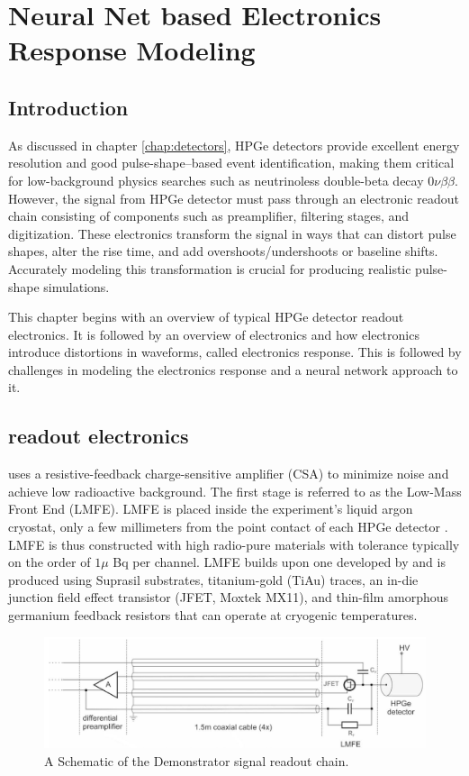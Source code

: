 \chapter{Neural Net based Electronics Response Modeling}
\label{chap:elect_resp}

\section{Introduction}
As discussed in chapter \ref{chap:detectors}, HPGe detectors provide excellent energy resolution and good pulse-shape–based event identification, making them critical for low-background physics searches such as neutrinoless double-beta decay $0\nu\beta\beta$. However, the signal from HPGe detector must pass through an electronic readout chain consisting of components such as preamplifier, filtering stages, and digitization. These electronics transform the signal in ways that can distort pulse shapes, alter the rise time, and add overshoots/undershoots or baseline shifts. Accurately modeling this transformation is crucial for producing realistic pulse-shape simulations.

This chapter begins with an overview of typical HPGe detector readout electronics. It is followed by an overview of {\Ltwo}  electronics and how electronics introduce distortions in waveforms, called electronics response. This is followed by challenges in modeling the electronics response and a neural network approach to it.

\section{{\Ltwo} readout electronics}

{\Ltwo} uses a resistive-feedback charge-sensitive amplifier (CSA) to minimize noise and achieve low radioactive background. The first stage is referred to as the Low-Mass Front End (LMFE). LMFE is placed inside the experiment’s liquid argon cryostat, only a few millimeters from the point contact of each HPGe detector \cite{Willers_2020}. LMFE is thus constructed with high radio-pure materials with tolerance typically on the order of $1\mu$ Bq per channel. LMFE builds upon one developed by {\MJD} and is produced using Suprasil substrates, titanium-gold (TiAu) traces, an in-die junction field effect transistor (JFET, Moxtek MX11), and thin-film amorphous germanium feedback resistors that can operate at cryogenic temperatures. 

\begin{figure}[!htb]%
    \includegraphics[width=0.99\linewidth,trim={1pc 0pc 1pc 0pc},clip]{ch6/figs/l200_elec_diagram.jpg}
    \caption{A Schematic of the Demonstrator signal readout chain.\cite{Willers_2020}}
   \label{fig:l200_elec_model}
\end{figure}

